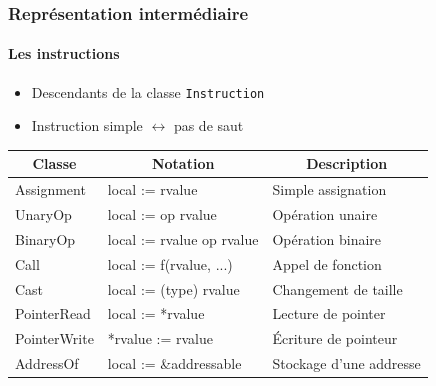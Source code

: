 \documentclass{beamer}
\newcommand*{\thead}[1]{\multicolumn{1}{|c|}{\bfseries #1}}
\begin{document}
\begin{frame}
    \frametitle{Représentation intermédiaire}
    \framesubtitle{Les instructions}
    \begin{itemize}
        \item Descendants de la classe \lstinline{Instruction}
        \item Instruction simple $\leftrightarrow$ pas de saut
    \end{itemize}
    \pause
    \begin{center}
        \begin{tabular}{ | l | l | l | }
        \hline
        \thead{Classe} & \thead{Notation} & \thead{Description} \\
        \hline 
        Assignment & local := rvalue & Simple assignation \pause \\ 
        \hline 
        UnaryOp & local := op rvalue & Opération unaire \pause \\
        \hline
        BinaryOp & local := rvalue op rvalue & Opération binaire \pause \\
        \hline
        Call & local := f(rvalue, ...) & Appel de fonction \pause \\
        \hline
        Cast & local := (type) rvalue & Changement de taille \pause \\
        \hline
        PointerRead & local := *rvalue & Lecture de pointer \pause \\
        \hline
        PointerWrite & *rvalue := rvalue & Écriture de pointeur \pause \\
        \hline
        AddressOf & local := \&addressable & Stockage d'une addresse\\
        \hline
        \end{tabular}
    \end{center}
\end{frame}
\end{document}
